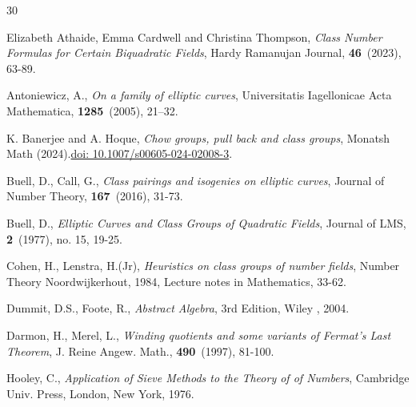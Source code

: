 \documentclass[12pt, 14paper]{amsart}
\theoremstyle{plain}
\numberwithin{equation}{section}
\newcommand\Mycomb[2][^n]{\prescript{#1\mkern-0.5mu}{}C_{#2}}
\begin{document}
\begin{thebibliography}{30}

 Elizabeth Athaide, Emma Cardwell and Christina Thompson, \textit{Class Number Formulas for Certain Biquadratic Fields}, Hardy Ramanujan Journal, \textbf{46}~(2023), 63-89.
 
  Antoniewicz, A., \textit{On a family of elliptic curves}, Universitatis Iagellonicae Acta Mathematica, \textbf{1285}~(2005), 21–32.

  K. Banerjee and A. Hoque, \textit{ Chow groups, pull back and class groups}, Monatsh Math (2024).\url{doi: 10.1007/s00605-024-02008-3}.
 
 Buell, D., Call, G., \textit{Class pairings and isogenies on elliptic curves}, Journal of Number Theory, \textbf{167}~(2016), 31-73.

 Buell, D., \textit{Elliptic Curves and Class Groups of Quadratic Fields}, Journal of LMS, \textbf{2}~(1977), no. 15, 19-25.

 Cohen, H., Lenstra, H.(Jr), \textit{Heuristics on class groups of number fields}, Number Theory Noordwijkerhout, 1984, Lecture notes in Mathematics, 33-62.

 



  {Dummit}, D.S., {Foote}, R., \textit{Abstract Algebra}, 3rd Edition,  Wiley , 2004.


  Darmon, H., Merel, L., \textit{Winding quotients and some variants of Fermat's Last Theorem}, J. Reine Angew. Math., \textbf{490}~(1997), 81-100.



  Hooley, C., \textit{Application of Sieve Methods to the Theory of of Numbers}, Cambridge Univ. Press, London, New York, 1976.


\end{thebibliography}
\end{document}
